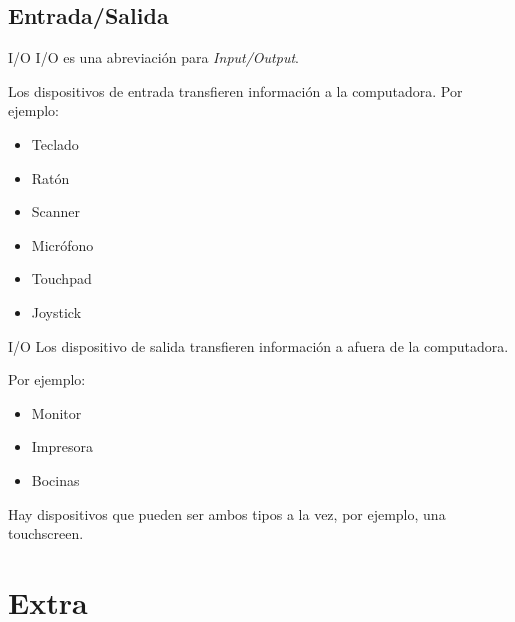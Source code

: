 \documentclass[11pt]{beamer}
\begin{document}
	\subsection{Entrada/Salida}
		\begin{frame}{I/O}
			I/O es una abreviación para \textit{Input/Output}.
			
			Los dispositivos de entrada transfieren información a la computadora. Por ejemplo:
			\begin{itemize}
				\item Teclado
				\item Ratón
				\item Scanner
				\item Micrófono
				\item Touchpad
				\item Joystick
			\end{itemize}
		\end{frame}
		\begin{frame}{I/O}
			Los dispositivo de salida transfieren información a afuera de la computadora.
			
			Por ejemplo:
			\begin{itemize}
				\item Monitor
				\item Impresora
				\item Bocinas
			\end{itemize}
			Hay dispositivos que pueden ser ambos tipos a la vez, por ejemplo, una touchscreen.
		\end{frame}
\section{Extra}
\end{document}
